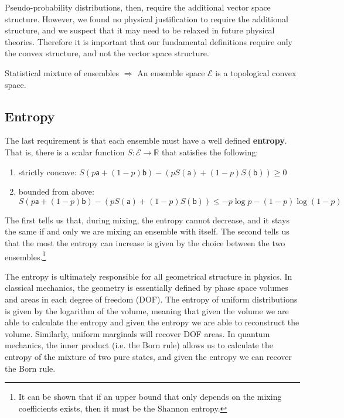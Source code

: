 \documentclass[10pt,twocolumn, nofootinbib]{revtex4-2}
\newcommand{\ens}[1][e] {\mathsf{#1}} %
\newcommand{\Ens}[1][E] {\mathcal{#1}} %
\begin{document}
Pseudo-probability distributions, then, require the additional vector space structure. However, we found no physical justification to require the additional structure, and we suspect that it may need to be relaxed in future physical theories.  Therefore it is important that our fundamental definitions require only the convex structure, and not the vector space structure.

\begin{tcolorbox}[colback=white, colframe=black]
	Statistical mixture of ensembles $\Rightarrow$ An ensemble space $\Ens$ is a topological convex space.
\end{tcolorbox}

\subsection{Entropy}
The last requirement is that each ensemble must have a well defined \textbf{entropy}. That is, there is a scalar function $S : \Ens \to \mathbb{R}$ that satisfies the following:
\begin{enumerate}
	\item strictly concave: $S(p \ens[a] + (1-p) \ens[b]) - (p S(\ens[a]) + (1-p) S(\ens[b]) ) \geq 0$
	\item bounded from above: $S(p \ens[a] + (1-p) \ens[b]) - (p S(\ens[a]) + (1-p) S(\ens[b]) ) \leq - p \log p - (1-p) \log(1-p)$
\end{enumerate}
The first tells us that, during mixing, the entropy cannot decrease, and it stays the same if and only we are mixing an ensemble with itself. The second tells us that the most the entropy can increase is given by the choice between the two ensembles.\footnote{It can be shown that if an upper bound that only depends on the mixing coefficients exists, then it must be the Shannon entropy.}

The entropy is ultimately responsible for all geometrical structure in physics. In classical mechanics, the geometry is essentially defined by phase space volumes and areas in each degree of freedom (DOF). The entropy of uniform distributions is given by the logarithm of the volume, meaning that given the volume we are able to calculate the entropy and given the entropy we are able to reconstruct the volume. Similarly, uniform marginals will recover DOF areas. In quantum mechanics, the inner product (i.e. the Born rule) allows us to calculate the entropy of the mixture of two pure states, and given the entropy we can recover the Born rule.
\end{document}
